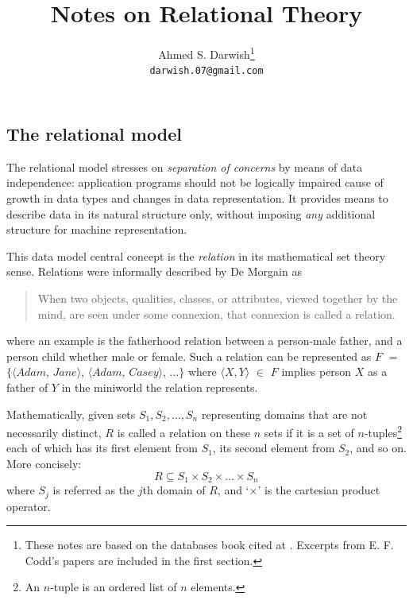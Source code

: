 \documentclass [a4paper, 12pt, twocolumn]{article}
\newcommand{\m}    {\mathit}            %
\newcommand{\<}    {\langle}            %
\renewcommand{\>}  {\rangle}            %
\begin{document}
\title{Notes on Relational Theory}

\author{Ahmed S. Darwish\footnote{These notes are based on the databases book
cited at \cite{elmasri}. Excerpts from E. F. Codd's papers are included in the
first section.}\\
\texttt{darwish.07@gmail.com}}

\maketitle

\subsection{The relational model}

The relational model stresses on \emph{separation of concerns} by means
of data independence: application programs should not be logically impaired
cause of growth in data types and changes in data representation. It provides
means to describe data in its natural structure only, without imposing
\emph{any} additional structure for machine representation.\cite{codd-v1}

This data model central concept is the \emph{relation} in its mathematical
set theory sense. Relations were informally described by De Morgain as
\begin{quote}
When two objects, qualities, classes, or attributes, viewed together by the
mind, are seen under some connexion, that connexion is called a relation.
\end{quote}
where an example is the fatherhood relation between a person-male father, and
a person child whether male or female. Such a relation can be represented as
$\m{F}$ $=$ $\{\<\m{Adam}$, $\m{Jane}\>$, $\<\m{Adam}$, $\m{Casey}\>$,
$\ldots \}$ where $\<X, Y\>$ $\in$ $\m{F}$ implies person $X$ as a father of
$Y$ in the miniworld the relation represents.

Mathematically, given sets $S_1, S_2, \ldots, S_n$ representing domains that
are not necessarily distinct, $R$ is called a relation on these $n$ sets if
it is a set of $n$-tuples\footnote{An $n$-tuple is an ordered list of $n$
elements.} each of which has its first element from $S_1$, its second element
from $S_2$, and so on. More concisely:
\begin{equation*}
  R \subseteq S_1 \times S_2 \times \ldots \times S_n
\end{equation*}
where $S_j$ is referred as the $j$th domain of $R$, and `$\times$' is the
cartesian product operator.
\end{document}
